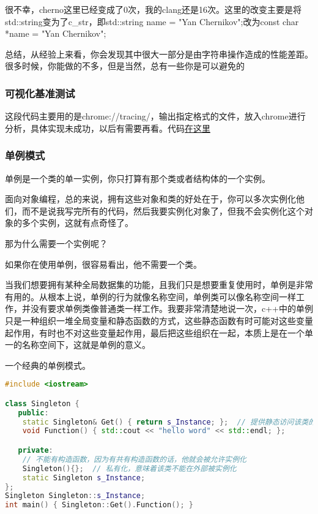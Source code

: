 很不幸，cherno这里已经变成了0次，我的clang还是16次。这里的改变主要是将{\ncodestyle std::string}变为了{\ncodestyle c_str}，即{\ncodestyle std::string name = "Yan Chernikov";}改为{\ncodestyle const char *name = "Yan Chernikov";}

总结，从经验上来看，你会发现其中很大一部分是由字符串操作造成的性能差距。很多时候，你能做的不多，但是当然，总有一些你是可以避免的

\subsubsection{可视化基准测试}

这段代码主要用的是{\ncodestyle chrome://tracing/}，输出指定格式的文件，放入chrome进行分析，具体实现未成功，以后有需要再看。代码\href{https://gist.github.com/TheCherno/31f135eea6ee729ab5f26a6908eb3a5e}{在这里}


\subsubsection{单例模式}
单例是一个类的单一实例，你只打算有那个类或者结构体的一个实例。

面向对象编程，总的来说，拥有这些对象和类的好处在于，你可以多次实例化他们，而不是说我写完所有的代码，然后我要实例化对象了，但我不会实例化这个对象的多个实例，这就有点奇怪了。

那为什么需要一个实例呢？

如果你在使用单例，很容易看出，他不需要一个类。

当我们想要拥有某种全局数据集的功能，且我们只是想要重复使用时，单例是非常有用的。从根本上说，单例的行为就像名称空间，单例类可以像名称空间一样工作，并没有要求单例类像普通类一样工作。我要非常清楚地说一次，c++中的单例只是一种组织一堆全局变量和静态函数的方式，这些静态函数有时可能对这些变量起作用，有时也不对这些变量起作用，最后把这些组织在一起，本质上是在一个单一的名称空间下，这就是单例的意义。

一个经典的单例模式。

\begin{lstlisting}[language=c++]
#include <iostream>

class Singleton {
   public:
    static Singleton& Get() { return s_Instance; };  // 提供静态访问该类的方法
    void Function() { std::cout << "hello word" << std::endl; };

   private:
    // 不能有构造函数，因为有共有构造函数的话，他就会被允许实例化
    Singleton(){};  // 私有化，意味着该类不能在外部被实例化
    static Singleton s_Instance;
};
Singleton Singleton::s_Instance;
int main() { Singleton::Get().Function(); }
\end{lstlisting}


